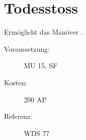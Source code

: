 \section{Todesstoss}
\label{sf.todesstoss}
Ermöglicht das Manöver .
\begin{description}
    \item[Voraussetzung:]
        MU 15, SF 
    \item [Kosten:]
        200 AP
    \item [Referenz:]
        WDS 77
\end{description}
